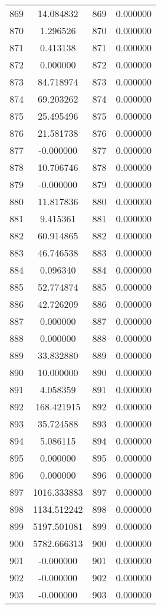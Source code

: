 \documentclass[12pt]{article}
\begin{document}
\begin{longtable}{@{}cccc@{}}
869 & 14.084832 & 869 & 0.000000 \\
870 & 1.296526 & 870 & 0.000000 \\
871 & 0.413138 & 871 & 0.000000 \\
872 & 0.000000 & 872 & 0.000000 \\
873 & 84.718974 & 873 & 0.000000 \\
874 & 69.203262 & 874 & 0.000000 \\
875 & 25.495496 & 875 & 0.000000 \\
876 & 21.581738 & 876 & 0.000000 \\
877 & -0.000000 & 877 & 0.000000 \\
878 & 10.706746 & 878 & 0.000000 \\
879 & -0.000000 & 879 & 0.000000 \\
880 & 11.817836 & 880 & 0.000000 \\
881 & 9.415361 & 881 & 0.000000 \\
882 & 60.914865 & 882 & 0.000000 \\
883 & 46.746538 & 883 & 0.000000 \\
884 & 0.096340 & 884 & 0.000000 \\
885 & 52.774874 & 885 & 0.000000 \\
886 & 42.726209 & 886 & 0.000000 \\
887 & 0.000000 & 887 & 0.000000 \\
888 & 0.000000 & 888 & 0.000000 \\
889 & 33.832880 & 889 & 0.000000 \\
890 & 10.000000 & 890 & 0.000000 \\
891 & 4.058359 & 891 & 0.000000 \\
892 & 168.421915 & 892 & 0.000000 \\
893 & 35.724588 & 893 & 0.000000 \\
894 & 5.086115 & 894 & 0.000000 \\
895 & 0.000000 & 895 & 0.000000 \\
896 & 0.000000 & 896 & 0.000000 \\
897 & 1016.333883 & 897 & 0.000000 \\
898 & 1134.512242 & 898 & 0.000000 \\
899 & 5197.501081 & 899 & 0.000000 \\
900 & 5782.666313 & 900 & 0.000000 \\
901 & -0.000000 & 901 & 0.000000 \\
902 & -0.000000 & 902 & 0.000000 \\
903 & -0.000000 & 903 & 0.000000 \\

\end{longtable}
\end{document}
